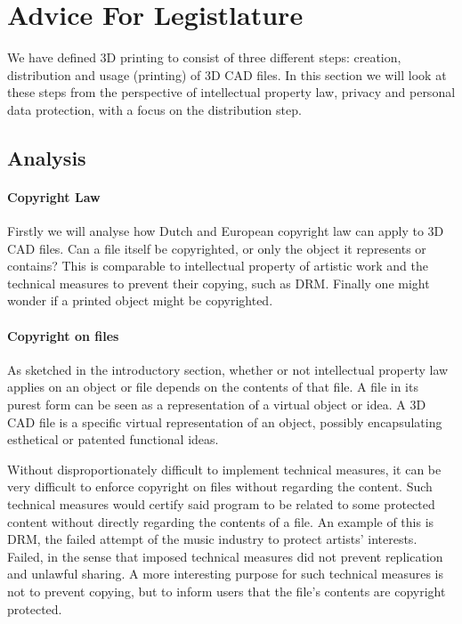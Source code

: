 \section{Advice For Legistlature}

We have defined 3D printing to consist of three different steps: creation, 
distribution and usage (printing) of 3D CAD files.
In this section we will look at these steps from the perspective of intellectual
 property law, privacy and personal data protection, with a focus on the 
 distribution step.


\subsection{Analysis}

\paragraph{Copyright Law}
Firstly we will analyse how Dutch and European copyright law can apply to 3D CAD
 files.
Can a file itself be copyrighted, or only the object it represents or contains? 
This is comparable to intellectual property of artistic work and the technical 
measures to prevent their copying, such as DRM.
Finally one might wonder if a printed object might be copyrighted.

\paragraph{Copyright on files}
As sketched in the introductory section, whether or not intellectual property 
law applies on an object or file depends on the contents of that file.
A file in its purest form can be seen as a representation of a virtual object or
 idea.
A 3D CAD file is a specific virtual representation of an object, possibly 
encapsulating esthetical or patented functional ideas.

Without disproportionately difficult to implement technical measures, it can be 
very difficult to enforce copyright on files without regarding the content.
Such technical measures would certify said program to be related to some 
protected content without directly regarding the contents of a file.
An example of this is DRM, the failed attempt of the music industry to protect 
artists’ interests.
Failed, in the sense that imposed technical measures did not prevent replication
 and unlawful sharing.
A more interesting purpose for such technical measures is not to prevent 
copying, but to inform users that the file’s contents are copyright protected.

